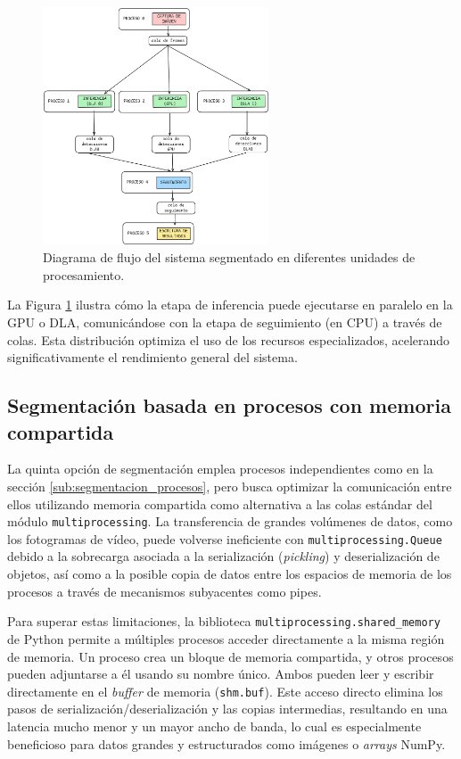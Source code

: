 \documentclass[11pt,spanish,listoffigures,listoftables]{tfgetsinf}
\begin{document}
\begin{figure}[H]
   \centering
   \includegraphics[width=0.6\textwidth]{images/diseno_e_implementacion/segmentacion_multihardware.png}
   \caption{Diagrama de flujo del sistema segmentado en diferentes unidades de procesamiento.}
   \label{fig:segmentacion_multihardware}
\end{figure}

La Figura \ref{fig:segmentacion_multihardware} ilustra cómo la etapa de inferencia puede ejecutarse en paralelo en la GPU o DLA, comunicándose con la etapa de seguimiento (en CPU) a través de colas. Esta distribución optimiza el uso de los recursos especializados, acelerando significativamente el rendimiento general del sistema.


\subsection{Segmentación basada en procesos con memoria compartida} \label{sub:segmentacion_memoria_compartida}


La quinta opción de segmentación emplea procesos independientes como en la sección \ref{sub:segmentacion_procesos}, pero busca optimizar la comunicación entre ellos utilizando memoria compartida como alternativa a las colas estándar del módulo \texttt{multiprocessing}. La transferencia de grandes volúmenes de datos, como los fotogramas de vídeo, puede volverse ineficiente con \texttt{multiprocessing.Queue} debido a la sobrecarga asociada a la serialización (\textit{pickling}) y deserialización de objetos, así como a la posible copia de datos entre los espacios de memoria de los procesos a través de mecanismos subyacentes como pipes.

Para superar estas limitaciones, la biblioteca \texttt{multiprocessing.shared\_memory} de Python permite a múltiples procesos acceder directamente a la misma región de memoria. Un proceso crea un bloque de memoria compartida, y otros procesos pueden adjuntarse a él usando su nombre único. Ambos pueden leer y escribir directamente en el \textit{buffer} de memoria (\texttt{shm.buf}). Este acceso directo elimina los pasos de serialización/deserialización y las copias intermedias, resultando en una latencia mucho menor y un mayor ancho de banda, lo cual es especialmente beneficioso para datos grandes y estructurados como imágenes o \textit{arrays} NumPy.
\end{document}
